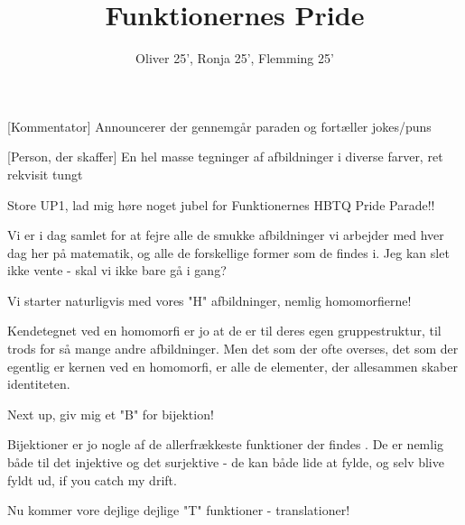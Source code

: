 \documentclass[a4paper,11pt]{article}
\title{Funktionernes Pride}
\author{Oliver 25', Ronja 25', Flemming 25'}
\begin{document}
\maketitle

\begin{roles}
[Kommentator] Announcerer der gennemgår paraden og fortæller jokes/puns
\end{roles}

\begin{props}
[Person, der skaffer] En hel masse tegninger af afbildninger i diverse farver, ret rekvisit tungt
\end{props}


\begin{sketch}


 Store UP1, lad mig høre noget jubel for Funktionernes HBTQ Pride Parade!! 

 Vi er i dag samlet for at fejre alle de smukke afbildninger vi arbejder med hver dag her på matematik, og alle de forskellige former som de findes i. Jeg kan slet ikke vente - skal vi ikke bare gå i gang? 

 Vi starter naturligvis med vores "H" afbildninger, nemlig homomorfierne!


 Kendetegnet ved en homomorfi er jo at de er til deres egen gruppestruktur, til trods for så mange andre afbildninger. Men det som der ofte overses, det som der egentlig er kernen ved en homomorfi, er alle de elementer, der allesammen skaber identiteten.


 Next up, giv mig et "B"  for bijektion!


 Bijektioner er jo nogle af de allerfrækkeste funktioner der findes . De er nemlig både til det injektive og det surjektive - de kan både lide at fylde, og selv blive fyldt ud, if you catch my drift.


 Nu kommer vore dejlige dejlige "T" funktioner - translationer! 


\end{sketch}
\end{document}
